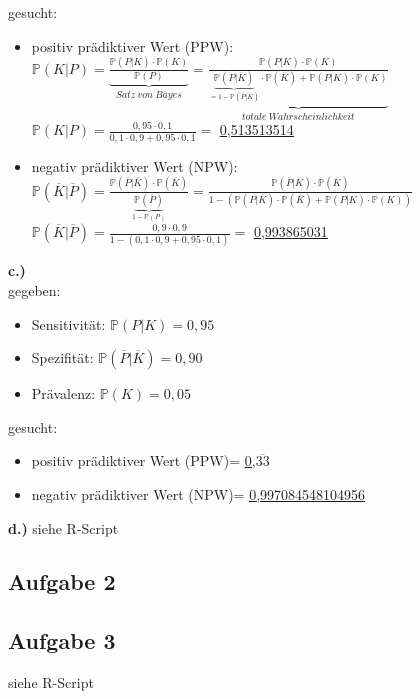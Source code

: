 \documentclass[13pt,a4paper]{article}
\begin{document}
gesucht:\\
\begin{itemize}
	\item positiv prädiktiver Wert (PPW): \\
	$\mathbb{P}(K|P) = \underbrace{\frac{\mathbb{P}(P|K) \cdot \mathbb{P}(K)}{\mathbb{P}(P)}}_{Satz\ von\ Bayes} = \underbrace{\frac{\mathbb{P}(P|K) \cdot \mathbb{P}(K)}{\underbrace{\mathbb{P}(P|\overline{K})}_{=1-\mathbb{P}(\overline{P}|\overline{K})} \cdot \mathbb{P}(\overline{K}) + \mathbb{P}(P|K) \cdot \mathbb{P}(K)}}_{totale\ Wahrscheinlichkeit}$\\
	$\mathbb{P}(K|P) = \frac{0,95 \cdot 0,1}{0,1 \cdot 0,9 + 0,95 \cdot 0,1} = $ \underline{\underline{0,513513514}}
	\item negativ prädiktiver Wert (NPW):\\
	$\mathbb{P}(\overline{K}|\overline{P})= \frac{\mathbb{P}(\overline{P}|\overline{K}) \cdot \mathbb{P}(\overline{K})}{\underbrace{\mathbb{P}(\overline{P})}_{1-\mathbb{P}(P)}} = \frac{\mathbb{P}(\overline{P}|\overline{K}) \cdot \mathbb{P}(\overline{K})}{1 - (\mathbb{P}(P|\overline{K}) \cdot \mathbb{P}(\overline{K}) + \mathbb{P}(P|K) \cdot \mathbb{P}(K))}$\\
	$\mathbb{P}(\overline{K}|\overline{P})= \frac{0,9 \cdot 0,9}{1-(0,1 \cdot 0,9 + 0,95 \cdot 0,1)} =$ \underline{\underline{0,993865031}}
\end{itemize}

\textbf{c.)}
\\
gegeben:
\begin{itemize}
	\item Sensitivität: $\mathbb{P}(P|K)=0,95$
	\item Spezifität: $\mathbb{P}(\overline{P}|\overline{K})=0,90$
	\item Prävalenz: $\mathbb{P}(K)=0,05$
\end{itemize}

gesucht:\\
\begin{itemize}
	\item positiv prädiktiver Wert (PPW)= \underline{\underline{0,$\overline{33}$}}
	\item negativ prädiktiver Wert (NPW)= \underline{\underline{0,997084548104956}}
\end{itemize}

\textbf{d.)}
siehe R-Script

\subsection{Aufgabe 2}

\subsection{Aufgabe 3}
siehe R-Script
\end{document}
